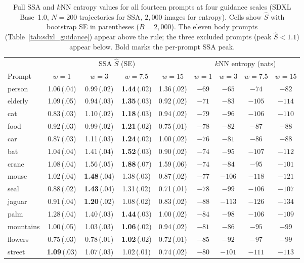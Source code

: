 \documentclass{article}
\begin{document}
\begin{table}[H]
\centering
\caption{  Full SSA and $k$NN entropy values for all fourteen
prompts at four guidance scales (SDXL Base~1.0, $N = 200$ trajectories
for SSA, $2{,}000$ images for entropy). Cells show $\hat S$ with
bootstrap SE in parentheses ($B = 2{,}000$). The eleven body prompts
(Table~\ref{tab:sdxl_guidance}) appear above the rule; the three
excluded prompts (peak $\hat S < 1.1$) appear below. Bold marks the
per-prompt SSA peak.}
\label{tab:sdxl_full}
 
\setlength{\tabcolsep}{3pt}
\begin{tabular}{@{}lcccc|cccc@{}}
\toprule
& \multicolumn{4}{c|}{SSA $\hat S$ (SE)} & \multicolumn{4}{c}{$k$NN entropy (nats)} \\
Prompt & $w{=}1$ & $w{=}3$ & $w{=}7.5$ & $w{=}15$ & $w{=}1$ & $w{=}3$ & $w{=}7.5$ & $w{=}15$ \\
\midrule
person    & 1.06\,(.04) & 0.99\,(.02) & \textbf{1.44}\,(.02) & 1.36\,(.02) & $-69$ & $-65$  & $-74$  & $-82$  \\
elderly   & 1.09\,(.05) & 0.94\,(.03) & \textbf{1.35}\,(.03) & 0.92\,(.02) & $-71$ & $-83$  & $-105$ & $-114$ \\
cat       & 0.83\,(.03) & 1.10\,(.02) & \textbf{1.18}\,(.03) & 0.94\,(.02) & $-79$ & $-96$  & $-106$ & $-110$ \\
food      & 0.92\,(.03) & 0.99\,(.02) & \textbf{1.21}\,(.02) & 0.75\,(.01) & $-78$ & $-82$  & $-87$  & $-88$  \\
car       & 0.87\,(.03) & 1.11\,(.03) & \textbf{1.24}\,(.02) & 1.00\,(.02) & $-76$ & $-81$  & $-86$  & $-88$  \\
bat       & 1.04\,(.04) & 1.41\,(.04) & \textbf{1.52}\,(.03) & 0.90\,(.02) & $-74$ & $-95$  & $-107$ & $-112$ \\
crane     & 1.08\,(.04) & 1.56\,(.05) & \textbf{1.88}\,(.07) & 1.59\,(.06) & $-74$ & $-84$  & $-95$  & $-101$ \\
mouse     & 1.02\,(.04) & \textbf{1.48}\,(.04) & 1.38\,(.03) & 0.87\,(.02) & $-77$ & $-106$ & $-118$ & $-121$ \\
seal      & 0.88\,(.02) & \textbf{1.43}\,(.04) & 1.31\,(.02) & 0.71\,(.01) & $-78$ & $-99$  & $-106$ & $-107$ \\
jaguar    & 0.91\,(.04) & \textbf{1.20}\,(.02) & 1.08\,(.02) & 0.83\,(.02) & $-88$ & $-113$ & $-126$ & $-134$ \\
palm      & 1.28\,(.04) & 1.40\,(.03) & \textbf{1.44}\,(.03) & 1.00\,(.02) & $-84$ & $-98$  & $-106$ & $-109$ \\
\midrule
mountains & 1.00\,(.05) & 1.03\,(.03) & \textbf{1.06}\,(.02) & 0.94\,(.02) & $-81$ & $-86$  & $-95$  & $-99$  \\
flowers   & 0.75\,(.03) & 0.78\,(.01) & \textbf{1.02}\,(.02) & 0.72\,(.01) & $-85$ & $-92$  & $-97$  & $-99$  \\
street    & \textbf{1.09}\,(.03) & 1.07\,(.03) & 1.02\,(.01) & 0.74\,(.02) & $-80$ & $-101$ & $-111$ & $-113$ \\
\bottomrule
\end{tabular}
\end{table}
\end{document}
